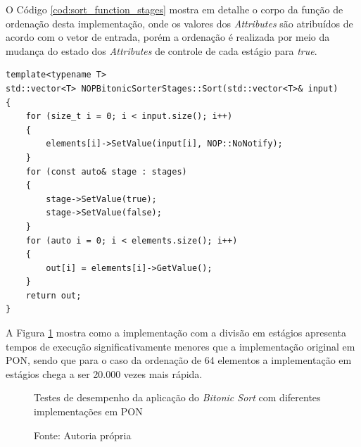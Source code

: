 O Código \ref{cod:sort_function_stages} mostra em detalhe o corpo da função de
ordenação desta implementação, onde os valores dos \textit{Attributes} são
atribuídos de acordo com o vetor de entrada, porém a ordenação é realizada por
meio da mudança do estado dos \textit{Attributes} de controle de cada estágio
para \textit{true}.

\begin{lstlisting}[caption = {Trecho de código da estrutura NOPBitonicSorterStages},
  source = {Autoria própria}, float=htb,
  label = {cod:sort_function_stages}]
template<typename T>
std::vector<T> NOPBitonicSorterStages::Sort(std::vector<T>& input)
{
    for (size_t i = 0; i < input.size(); i++)
    {
        elements[i]->SetValue(input[i], NOP::NoNotify);
    }
    for (const auto& stage : stages)
    {
        stage->SetValue(true);
        stage->SetValue(false);
    }
    for (auto i = 0; i < elements.size(); i++)
    {
        out[i] = elements[i]->GetValue();
    }
    return out;
}
\end{lstlisting}

\FloatBarrier

A Figura \ref{fig:bitonic_bench_nop} mostra como a implementação com a divisão
em estágios apresenta tempos de execução significativamente menores que a
implementação original em PON, sendo que para o caso da ordenação de 64
elementos a implementação em estágios chega a ser 20.000 vezes mais rápida.

\begin{figure}[!htb]
\centering
{}
\caption{Testes de desempenho da aplicação do \textit{Bitonic Sort} com
diferentes implementações em PON}
\caption*{Fonte: Autoria própria}
\label{fig:bitonic_bench_nop}
\end{figure}

